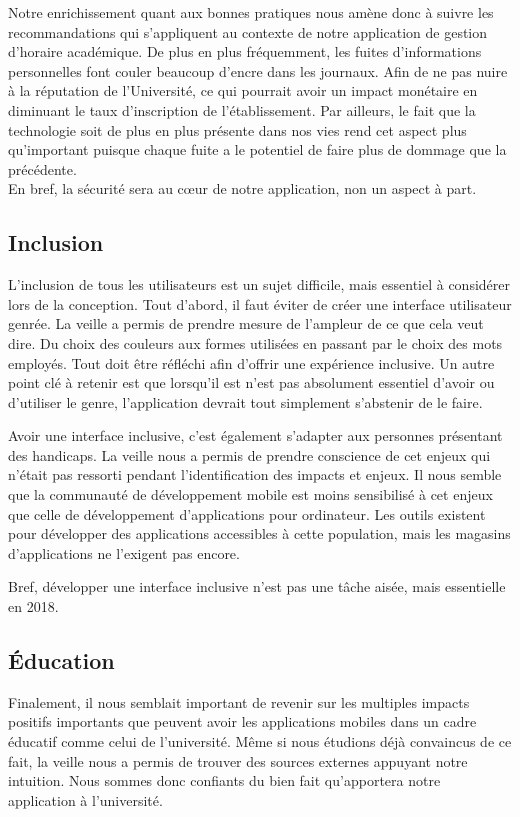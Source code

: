 		Notre enrichissement quant aux bonnes pratiques nous amène donc à suivre les recommandations qui s'appliquent au contexte de notre application de gestion d'horaire académique. De plus en plus fréquemment, les fuites d'informations personnelles font couler beaucoup d'encre dans les journaux. Afin de ne pas nuire à la réputation de l'Université, ce qui pourrait avoir un impact monétaire en diminuant le taux d'inscription de l'établissement. Par ailleurs, le fait que la technologie soit de plus en plus présente dans nos vies rend cet aspect plus qu'important puisque chaque fuite a le potentiel de faire plus de dommage que la précédente. \\
		
		En bref, la sécurité sera au c\oe ur de notre application, non un aspect à part. 
		
		\subsection{Inclusion}
		L'inclusion de tous les utilisateurs est un sujet difficile, mais essentiel à considérer lors de la conception. Tout d'abord, il faut éviter de créer une interface utilisateur genrée. La veille a permis de prendre mesure de l'ampleur de ce que cela veut dire. Du choix des couleurs aux formes utilisées en passant par le choix des mots employés. Tout doit être réfléchi afin d'offrir une expérience inclusive. Un autre point clé à retenir est que lorsqu'il est n'est pas absolument essentiel d'avoir ou d'utiliser le genre, l'application devrait tout simplement s'abstenir de le faire.
		
		Avoir une interface inclusive, c'est également s'adapter aux personnes présentant des handicaps. La veille nous a permis de prendre conscience de cet enjeux qui n'était pas ressorti pendant l'identification des impacts et enjeux. Il nous semble que la communauté de développement mobile est moins sensibilisé à cet enjeux que celle de développement d'applications pour ordinateur. Les outils existent pour développer des applications accessibles à cette population, mais les magasins d'applications ne l'exigent pas encore.
		
		Bref, développer une interface inclusive n'est pas une tâche aisée, mais essentielle en 2018.
		
		\subsection{Éducation}
		Finalement, il nous semblait important de revenir sur les multiples impacts positifs importants que peuvent avoir les applications mobiles dans un cadre éducatif comme celui de l'université. Même si nous étudions déjà convaincus de ce fait, la veille nous a permis de trouver des sources externes appuyant notre intuition. Nous  sommes donc confiants du bien fait qu'apportera notre application à l'université.
		
		
	
	
	
	
	
	